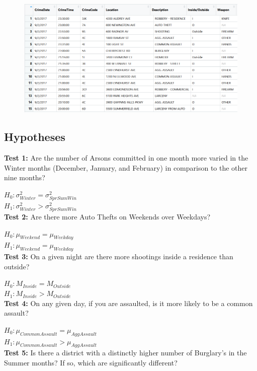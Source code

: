 \documentclass{article}
\newlength\tindent
\renewcommand{\indent}{\hspace*{\tindent}}
\begin{document}
\begin{figure}[h]
\centering
\includegraphics[width = 1.0\textwidth]{DataSetView.png}
\end{figure}


\subsection*{Hypotheses}
\indent  \textbf{Test 1:} Are the number of Arsons committed in one month more varied in the Winter months (December, January, and February) in comparison to the other nine months?

$H_{0}: \sigma_{Winter}^{2} = \sigma_{SprSumWin}^{2}$ \\
$H_{1}: \sigma_{Winter}^{2} > \sigma_{SprSumWin}^{2}$ \\

\indent \textbf{Test 2:} Are there more Auto Thefts on Weekends over Weekdays?

$H_{0}: \mu_{Weekend} = \mu_{Weekday}$ \\
$H_{1}: \mu_{Weekend} = \mu_{Weekday}$ \\

\indent \textbf{Test 3:} On a given night are there more shootings inside a residence than outside?  

$H_{0}: M_{Inside} = M_{Outside}$ \\
$H_{1}: M_{Inside} > M_{Outside}$ \\

\indent \textbf{Test 4:} On any given day, if you are assaulted, is it more likely to be a common assault?  

$H_{0}: \mu_{CommonAssault} = \mu_{AggAssault}$ \\
$H_{1}: \mu_{CommonAssault} > \mu_{AggAssault}$ \\

\indent \textbf{Test 5:} Is there a district with a distinctly higher number of Burglary's in the Summer months?  If so, which are significantly different?  
\end{document}

